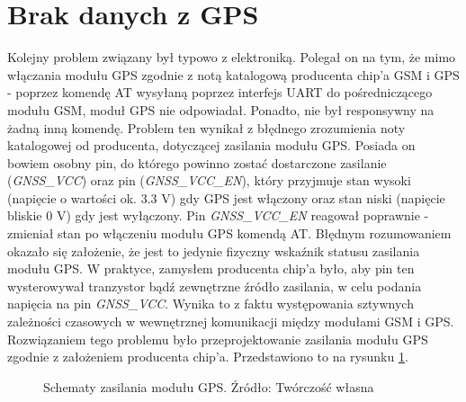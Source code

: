 \section{Brak danych z GPS}

Kolejny problem związany był typowo z elektroniką. Polegał on na tym, że mimo włączania modułu GPS zgodnie z notą katalogową producenta chip'a GSM i GPS - poprzez komendę AT wysyłaną poprzez interfejs UART do pośredniczącego modułu GSM, moduł GPS nie odpowiadał. Ponadto, nie był responsywny na żadną inną komendę. Problem ten wynikał z błędnego zrozumienia noty katalogowej od producenta, dotyczącej zasilania modułu GPS. Posiada on bowiem osobny pin, do którego powinno zostać dostarczone zasilanie (\textit{GNSS\_VCC}) oraz pin (\textit{GNSS\_VCC\_EN}), który przyjmuje stan wysoki (napięcie o wartości ok. 3.3 V) gdy GPS jest włączony oraz stan niski (napięcie bliskie 0 V) gdy jest wyłączony. Pin \textit{GNSS\_VCC\_EN} reagował poprawnie - zmieniał stan po włączeniu modułu GPS komendą AT. Błędnym rozumowaniem okazało się założenie, że jest to jedynie fizyczny wskaźnik statusu zasilania modułu GPS. W praktyce, zamysłem producenta chip'a było, aby pin ten wysterowywał tranzystor bądź zewnętrzne źródło zasilania, w celu podania napięcia na pin \textit{GNSS\_VCC}. Wynika to z faktu występowania sztywnych zależności czasowych w wewnętrznej komunikacji między modułami GSM i GPS. Rozwiązaniem tego problemu było przeprojektowanie zasilania modułu GPS zgodnie z założeniem producenta chip'a. Przedstawiono to na rysunku \ref{fig:image_mistake_gps_power}.

\begin{figure}[H]
\centering
	\qquad
	
	\caption{Schematy zasilania modułu GPS. Źródło: Twórczość własna}
	\label{fig:image_mistake_gps_power}
\end{figure}

